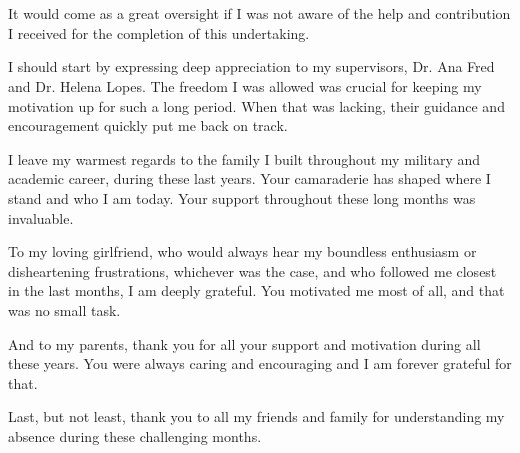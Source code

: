 
\section*{\acknowledgments}


It would come as a great oversight if I was not aware of the help and contribution I received for the completion of this undertaking.

I should start by expressing deep appreciation to my supervisors, Dr. Ana Fred and Dr. Helena Lopes.
The freedom I was allowed was crucial for keeping my motivation up for such a long period.
When that was lacking, their guidance and encouragement quickly put me back on track.

I leave my warmest regards to the family I built throughout my military and academic career, during these last years.
Your camaraderie has shaped where I stand and who I am today.
Your support throughout these long months was invaluable.

To my loving girlfriend, who would always hear my boundless enthusiasm or disheartening frustrations, whichever was the case, and who followed me closest in the last months, I am deeply grateful.
You motivated me most of all, and that was no small task.

And to my parents, thank you for all your support and motivation during all these years.
You were always caring and encouraging and I am forever grateful for that.

Last, but not least, thank you to all my friends and family for understanding my absence during these challenging months.
\cleardoublepage

